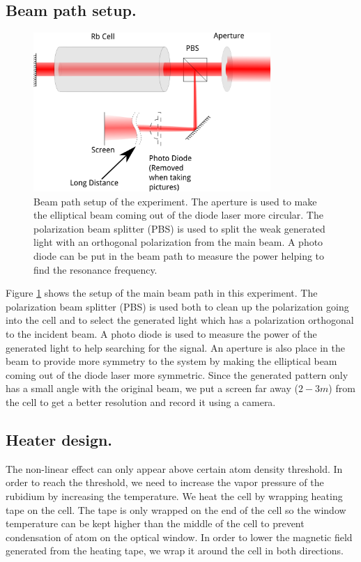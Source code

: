 \documentclass[aps,twocolumn,secnumarabic,balancelastpage,amsmath,amssymb,nofootinbib]{revtex4}
\begin{document}
\subsection{Beam path setup.}
\begin{figure}
  \includegraphics[width=9cm]{apparatus.png}
  \caption{Beam path setup of the experiment. The aperture is used to make the elliptical beam coming out of the diode laser more circular. The polarization beam splitter (PBS) is used to split the weak generated light with an orthogonal polarization from the main beam. A photo diode can be put in the beam path to measure the power helping to find the resonance frequency.}
  \label{apparatus}
\end{figure}

Figure \ref{apparatus} shows the setup of the main beam path in this experiment. The polarization beam splitter (PBS) is used both to clean up the polarization going into the cell and to select the generated light which has a polarization orthogonal to the incident beam. A photo diode is used to measure the power of the generated light to help searching for the signal. An aperture is also place in the beam to provide more symmetry to the system by making the elliptical beam coming out of the diode laser more symmetric. Since the generated pattern only has a small angle with the original beam, we put a screen far away ($2-3m$) from the cell to get a better resolution and record it using a camera.

\subsection{Heater design.}
The non-linear effect can only appear above certain atom density threshold. In order to reach the threshold, we need to increase the vapor pressure of the rubidium by increasing the temperature. We heat the cell by wrapping heating tape on the cell. The tape is only wrapped on the end of the cell so the window temperature can be kept higher than the middle of the cell to prevent condensation of atom on the optical window. In order to lower the magnetic field generated from the heating tape, we wrap it around the cell in both directions.
\end{document}
